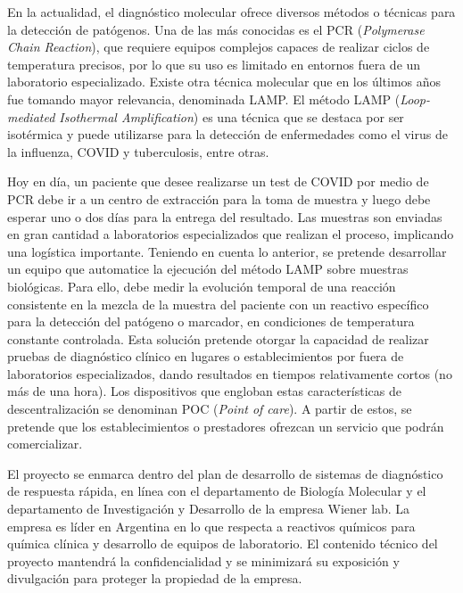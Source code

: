 \documentclass[
11pt, %
]{charter}
\begin{document}
En la actualidad, el diagnóstico molecular ofrece diversos métodos o técnicas para la detección de patógenos. Una de las más conocidas es el PCR (\textit{Polymerase Chain Reaction}), que requiere equipos complejos capaces de realizar ciclos de temperatura precisos, por lo que su uso es limitado en entornos fuera de un laboratorio especializado. Existe otra técnica molecular que en los últimos años fue tomando mayor relevancia, denominada LAMP. El método LAMP (\textit{Loop-mediated Isothermal Amplification}) es una técnica que se destaca por ser isotérmica y puede utilizarse para la detección de enfermedades como el virus de la influenza, COVID y tuberculosis, entre otras.

Hoy en día, un paciente que desee realizarse un test de COVID por medio de PCR debe ir a un centro de extracción para la toma de muestra y luego debe esperar uno o dos días para la entrega del resultado. Las muestras son enviadas en gran cantidad a laboratorios especializados que realizan el proceso, implicando una logística importante. Teniendo en cuenta lo anterior, se pretende desarrollar un equipo que automatice la ejecución del método LAMP sobre muestras biológicas. Para ello, debe medir la evolución temporal de una reacción consistente en la mezcla de la muestra del paciente con un reactivo específico para la detección del patógeno o marcador, en condiciones de temperatura constante controlada. Esta solución pretende otorgar la capacidad de realizar pruebas de diagnóstico clínico en lugares o establecimientos por fuera de laboratorios especializados, dando resultados en tiempos relativamente cortos (no más de una hora). Los dispositivos que engloban estas características de descentralización se denominan POC (\textit{Point of care}). A partir de estos, se pretende que los establecimientos o prestadores ofrezcan un servicio que podrán comercializar.

El proyecto se enmarca dentro del plan de desarrollo de sistemas de diagnóstico de respuesta rápida, en línea con el departamento de Biología Molecular y el departamento de Investigación y Desarrollo de la empresa Wiener lab. La empresa es líder en Argentina en lo que respecta a reactivos químicos para química clínica y desarrollo de equipos de laboratorio. El contenido técnico del proyecto mantendrá la confidencialidad y se minimizará su exposición y divulgación para proteger la propiedad de la empresa.
\end{document}
